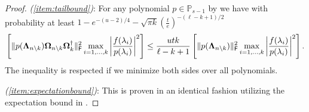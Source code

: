 \begin{proof}
\textit{(\ref*{item:tailbound})}: For any polynomial $p \in \mathbb{P}_{s-1}$ by \cite[Proposition 8.6]{tropp2023randomized} we have with probability at least $1-e^{-(u-2)/4} - \sqrt{\pi k} \left(\frac{t}{e}\right)^{-(\ell -k + 1)/2}$
\begin{equation*}
    \left[\|p(\bm{\Lambda}_{n \setminus k}) \bm{\Omega}_{n \setminus k} \bm{\Omega}_k^{\dagger}\|_{\textsf{\textup{F}}}^2\max\limits_{i=1,\ldots,k} \left|\frac{f(\lambda_i)}{p(\lambda_i)}\right|^2\right] \leq \frac{ut k}{\ell - k + 1}\left[\|p(\bm{\Lambda}_{n \setminus k})\|_{\textsf{\textup{F}}}^2\max\limits_{i=1,\ldots,k} \left|\frac{f(\lambda_i)}{p(\lambda_i)}\right|^2 \right].
\end{equation*}
The inequality is respected if we minimize both sides over all polynomials.

\textit{(\ref*{item:expectationbound})}: This is proven in an identical fashion utilizing the expectation bound in \cite[Proposition 8.6]{tropp2023randomized}.
\end{proof}

